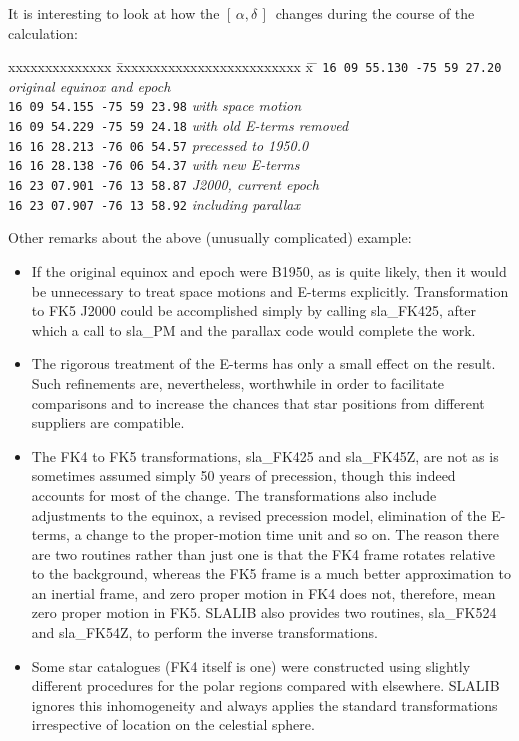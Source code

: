 \documentclass[11pt,twoside]{article}
\newcommand{\radec}     {$[\,\alpha,\delta\,]$}
\begin{document}
\goodbreak
It is interesting to look at how the \radec\ changes during the
course of the calculation:
\begin{tabbing}
xxxxxxxxxxxxxx \= xxxxxxxxxxxxxxxxxxxxxxxxx \= x \= \kill
\> {\tt 16 09 55.130 -75 59 27.20} \> \> {\it original equinox and epoch} \\
\> {\tt 16 09 54.155 -75 59 23.98} \> \> {\it with space motion} \\
\> {\tt 16 09 54.229 -75 59 24.18} \> \> {\it with old E-terms removed} \\
\> {\tt 16 16 28.213 -76 06 54.57} \> \> {\it precessed to 1950.0} \\
\> {\tt 16 16 28.138 -76 06 54.37} \> \> {\it with new E-terms} \\
\> {\tt 16 23 07.901 -76 13 58.87} \> \> {\it J2000, current epoch} \\
\> {\tt 16 23 07.907 -76 13 58.92} \> \> {\it including parallax}
\end{tabbing}

Other remarks about the above (unusually complicated) example:
\begin{itemize}
\item If the original equinox and epoch were B1950, as is quite
      likely, then it would be unnecessary to treat space motions
      and E-terms explicitly.  Transformation to FK5 J2000 could
      be accomplished simply by calling
sla\_FK425, after which
      a call to
sla\_PM and the parallax code would complete the
      work.
\item The rigorous treatment of the E-terms
      has only a small effect on the result.  Such refinements
      are, nevertheless, worthwhile in order to facilitate comparisons and
      to increase the chances that star positions from different
      suppliers are compatible.
\item The FK4 to FK5 transformations,
sla\_FK425
      and
sla\_FK45Z,
      are not as is sometimes assumed simply 50 years of precession,
      though this indeed accounts for most of the change.  The
      transformations also include adjustments
      to the equinox, a revised precession model, elimination of the
      E-terms, a change to the proper-motion time unit and so on.
      The reason there are two routines rather than just one
      is that the FK4 frame rotates relative to the background, whereas
      the FK5 frame is a much better approximation to an
      inertial frame, and zero proper
      motion in FK4 does not, therefore, mean zero proper motion in FK5.
      SLALIB also provides two routines,
sla\_FK524
      and
sla\_FK54Z,
      to perform the inverse transformations.
\item Some star catalogues (FK4 itself is one) were constructed using slightly
      different procedures for the polar regions compared with
      elsewhere.  SLALIB ignores this inhomogeneity and always
      applies the standard
      transformations irrespective of location on the celestial sphere.
\end{itemize}
\end{document}
